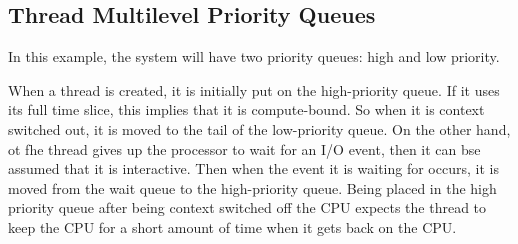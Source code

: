 \subsection{Thread Multilevel Priority Queues}
In this example, the system will have two priority queues: high and low priority.

When a thread is created, it is initially put on the high-priority queue. If it uses its full time slice, this implies that it is compute-bound. So when it is context switched out, it is moved to the tail of the low-priority queue. On the other hand, ot fhe thread gives up the processor to wait for an I/O event, then it can bse assumed that it is interactive. Then when the event it is waiting for occurs, it is moved from the wait queue to the high-priority queue. Being placed in the high priority queue after being context switched off the CPU expects the thread to keep the CPU for a short amount of time when it gets back on the CPU. 